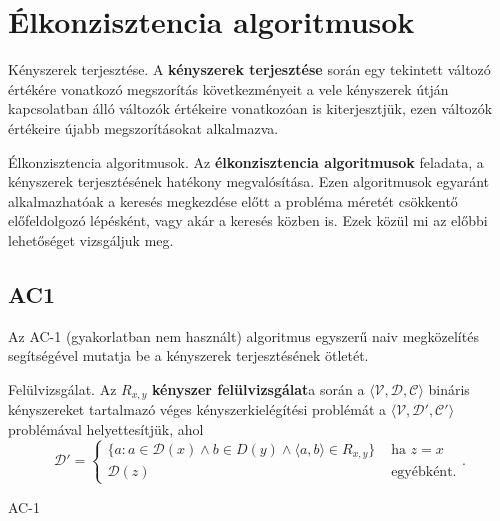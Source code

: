 \section{Élkonzisztencia algoritmusok}

\begin{definicio}
    Kényszerek terjesztése.
    A \textbf{kényszerek terjesztése} során egy tekintett változó értékére
    vonatkozó megszorítás következményeit a vele kényszerek útján kapcsolatban
    álló változók értékeire vonatkozóan is kiterjesztjük, ezen változók
    értékeire újabb megszorításokat alkalmazva.
\end{definicio}

\begin{definicio}
    Élkonzisztencia algoritmusok.
    Az \textbf{élkonzisztencia algoritmusok} feladata, a kényszerek
    terjesztésének hatékony megvalósítása. Ezen algoritmusok egyaránt
    alkalmazhatóak a keresés megkezdése előtt a probléma méretét csökkentő
    előfeldolgozó lépésként, vagy akár a keresés közben is. Ezek közül mi az
    előbbi lehetőséget vizsgáljuk meg.
\end{definicio}

\subsection{AC1}

Az AC-1 (gyakorlatban nem használt) algoritmus egyszerű naiv megközelítés
segítségével mutatja be a kényszerek terjesztésének ötletét.

\begin{definicio}
    Felülvizsgálat.
    Az $R_{x,y}$ \textbf{kényszer felülvizsgálat}a során a
    $\langle \mathcal{V}, \mathcal{D}, \mathcal{C} \rangle$
    bináris kényszereket tartalmazó véges kényszerkielégítési problémát a
    $\langle \mathcal{V}, \mathcal{D}', \mathcal{C}' \rangle$
    problémával helyettesítjük, ahol \[
    \mathcal{D}' =
    \begin{cases}
        \{a : a \in \mathcal{D}(x) \land b \in D(y) \land \langle a, b\rangle \in R_{x,y}\}
        &\text{ ha } z=x \\
        \mathcal{D}(z)
        &\text{ egyébként.}
    \end{cases}
    .\]
\end{definicio}

\begin{algorithm}[H]
    \DontPrintSemicolon
    {
        \;
    }
    \caption{AC-1}
\end{algorithm}

